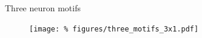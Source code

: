 \begin{frame}{Three neuron motifs}

  \begin{figure}
    \centering
    \texttt{[image: \%
      figures/three\_motifs\_3x1.pdf]} %
  \end{figure}
  

  
  
\end{frame}
